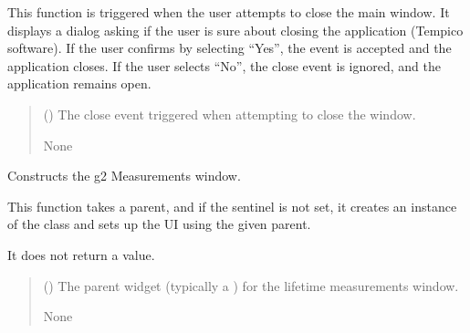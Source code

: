 \documentclass[letterpaper,10pt,english]{sphinxmanual}
\begin{document}
\begin{fulllineitems}
\begin{fulllineitems}
\sphinxAtStartPar
This function is triggered when the user attempts to close the main window. It displays 
a dialog asking if the user is sure about closing the application (Tempico software). 
If the user confirms by selecting “Yes”, the event is accepted and the application closes. 
If the user selects “No”, the close event is ignored, and the application remains open.
\begin{quote}\begin{description}
\sphinxAtStartPar
{} () \textendash{} The close event triggered when attempting to close the window.

\sphinxAtStartPar
None

\end{description}\end{quote}

\end{fulllineitems}


\begin{fulllineitems}
\label{\detokenize{main:main.MainWindow.construct_g2}}
\pysigstartsignatures
{}
\pysigstopsignatures
\sphinxAtStartPar
Constructs the g2 Measurements window.

\sphinxAtStartPar
This function takes a  parent, and if the sentinel is not set, it creates 
an instance of the  class and sets up the UI using the given parent.

\sphinxAtStartPar
It does not return a value.
\begin{quote}\begin{description}
\sphinxAtStartPar
{} () \textendash{} The parent widget (typically a ) for the lifetime measurements window.

\sphinxAtStartPar
None

\end{description}\end{quote}

\end{fulllineitems}


\end{fulllineitems}
\end{document}
